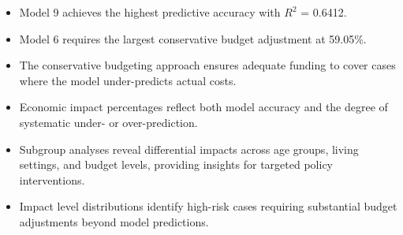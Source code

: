 \begin{itemize}
\item Model 9 achieves the highest predictive accuracy with $R^2$ = 0.6412.
\item Model 6 requires the largest conservative budget adjustment at 59.05\%.
\item The conservative budgeting approach ensures adequate funding to cover cases where the model under-predicts actual costs.
\item Economic impact percentages reflect both model accuracy and the degree of systematic under- or over-prediction.
\item Subgroup analyses reveal differential impacts across age groups, living settings, and budget levels, providing insights for targeted policy interventions.
\item Impact level distributions identify high-risk cases requiring substantial budget adjustments beyond model predictions.
\end{itemize}

